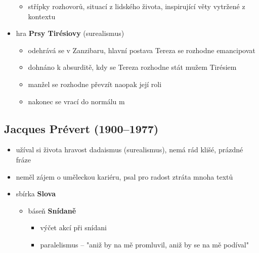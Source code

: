 \begin{itemize}
\begin{itemize}
	\item střípky rozhovorů, situací z lidského života, inspirující věty vytržené z kontextu
	\end{itemize}
\item hra \textbf{Prsy Tirésiovy} (surealismus)
	\begin{itemize}
	\item odehrává se v Zanzibaru, hlavní postava Tereza se rozhodne emancipovat
	\item dohnáno k absurditě, kdy se Tereza rozhodne stát mužem Tirésiem
	\item manžel se rozhodne převzít naopak její roli
	\item nakonec se vrací do normálu  m
	\end{itemize}
\end{itemize}

\subsection{Jacques Prévert (1900--1977)}
\begin{itemize}
\item užíval si života \ra hravost \ra dadaismus (surealismus), nemá rád klišé, prázdné fráze
\item neměl zájem o uměleckou kariéru, psal pro radost \ra ztráta mnoha textů
\item sbírka \textbf{Slova}
	\begin{itemize}
	\item báseň \textbf{Snídaně}
		\begin{itemize}
		\item výčet akcí při snídani
		\item paralelismus -- "aniž by na mě promluvil, aniž by se na mě podíval"
		\end{itemize}
	\end{itemize}
\end{itemize}

